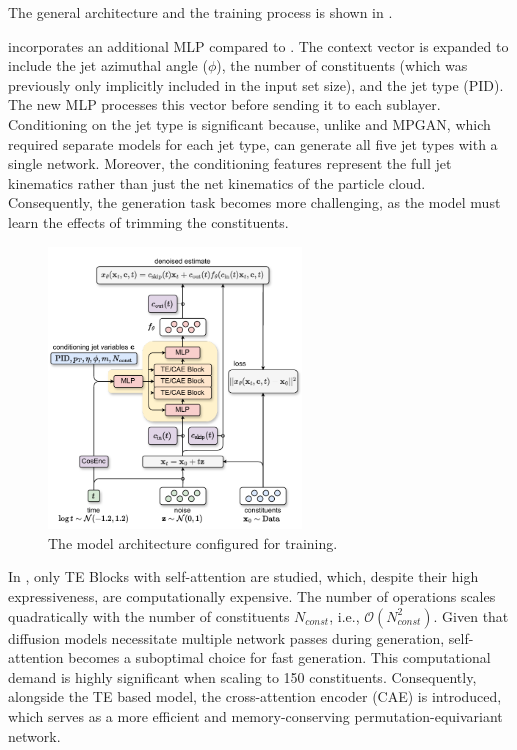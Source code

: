 The general \pcdroid architecture and the training process is shown in .

\pcdroid incorporates an additional MLP compared to \pcjedi.
The context vector is expanded to include the jet azimuthal angle ($\phi$), the number of constituents (which was previously only implicitly included in the input set size), and the jet type (PID).
The new MLP processes this vector before sending it to each sublayer.
Conditioning on the jet type is significant because, unlike \pcjedi and MPGAN, which required separate models for each jet type, \pcdroid can generate all five jet types with a single network.
Moreover, the conditioning features represent the full jet kinematics rather than just the net kinematics of the particle cloud.
Consequently, the generation task becomes more challenging, as the model must learn the effects of trimming the constituents.

\begin{figure}[htpb]
    \centering
    \includegraphics[width=0.6\textwidth]{Figures/jet_generation/pcdroid.pdf}
    \caption{The \pcdroid model architecture configured for training.}
    \label{fig:droid_arch_train}
\end{figure}

In \pcjedi, only TE Blocks with self-attention are studied, which, despite their high expressiveness, are computationally expensive.
The number of operations scales quadratically with the number of constituents $N_{const}$, i.e., $\mathcal{O}(N_{const}^2)$.
Given that diffusion models necessitate multiple network passes during generation, self-attention becomes a suboptimal choice for fast generation.
This computational demand is highly significant when scaling to 150 constituents.
Consequently, alongside the TE based model, the cross-attention encoder (CAE) is introduced, which serves as a more efficient and memory-conserving permutation-equivariant network.

